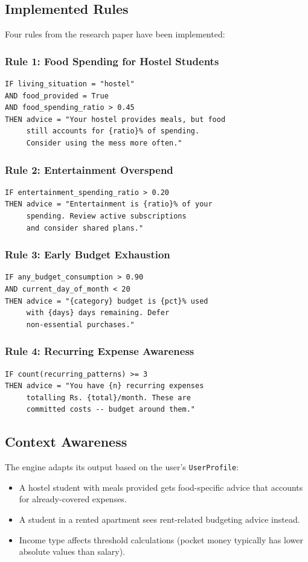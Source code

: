 \documentclass[12pt,a4paper]{article}
\begin{document}
\subsection{Implemented Rules}
Four rules from the research paper have been implemented:

\subsubsection{Rule 1: Food Spending for Hostel Students}
\begin{lstlisting}
IF living_situation = "hostel"
AND food_provided = True
AND food_spending_ratio > 0.45
THEN advice = "Your hostel provides meals, but food
     still accounts for {ratio}% of spending.
     Consider using the mess more often."
\end{lstlisting}

\subsubsection{Rule 2: Entertainment Overspend}
\begin{lstlisting}
IF entertainment_spending_ratio > 0.20
THEN advice = "Entertainment is {ratio}% of your
     spending. Review active subscriptions
     and consider shared plans."
\end{lstlisting}

\subsubsection{Rule 3: Early Budget Exhaustion}
\begin{lstlisting}
IF any_budget_consumption > 0.90
AND current_day_of_month < 20
THEN advice = "{category} budget is {pct}% used
     with {days} days remaining. Defer
     non-essential purchases."
\end{lstlisting}

\subsubsection{Rule 4: Recurring Expense Awareness}
\begin{lstlisting}
IF count(recurring_patterns) >= 3
THEN advice = "You have {n} recurring expenses
     totalling Rs. {total}/month. These are
     committed costs -- budget around them."
\end{lstlisting}

\subsection{Context Awareness}
The engine adapts its output based on the user's \texttt{UserProfile}:
\begin{itemize}
  \item A hostel student with meals provided gets food-specific advice that accounts for already-covered expenses.
  \item A student in a rented apartment sees rent-related budgeting advice instead.
  \item Income type affects threshold calculations (pocket money typically has lower absolute values than salary).
\end{itemize}
\end{document}
